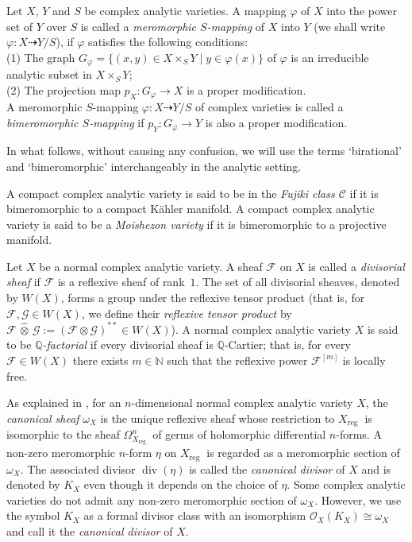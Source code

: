 \documentclass[12pt]{amsart}
\numberwithin{equation}{section}
\theoremstyle{definition}
\theoremstyle{plain}
\newtheorem*{thm A*}{Theorem A}
\newtheorem*{thm B*}{Theorem B}
\newtheorem*{thm C*}{Theorem C}
\newtheorem*{thm D*}{Theorem D}
\theoremstyle{definition}
\renewcommand{\1}{\mathds{1}}
\renewcommand{\>}{\rightarrow}
\begin{document}
Let $X$, $Y$ and $S$ be complex analytic varieties. A mapping $\varphi$ of $X$ into the power set of $Y$ over $S$ is called a \emph{meromorphic $S$-mapping} of $X$ into $Y$ (we shall write $\varphi: X \dashrightarrow Y/S$), if $\varphi$ satisfies the following conditions:\\
(1) The graph $G_{\varphi}=\{(x, y) \in X \times_S Y \mid y \in \varphi(x)\}$ of $\varphi$ is an irreducible analytic subset in ${X} \times_S {Y}$;\\
(2) The projection map ${p}_{{X}}: {G}_{\varphi} \to {X}$ is a proper modification. \\
A meromorphic $S$-mapping $\varphi: {X} \dashrightarrow {Y}/S$ of complex varieties is called a \emph{bimeromorphic $S$-mapping} if ${p}_{{Y}}: {G}_{\varphi} \to {Y}$ is also a proper modification. 

In what follows, without causing any confusion, we will use the terms `birational' and `bimeromorphic' interchangeably in the analytic setting.

A compact complex analytic variety is said to be in the \emph{Fujiki class $\mathcal{C}$} if it is bimeromorphic to a compact K\"ahler manifold. A compact complex analytic variety is said to be a \emph{Moishezon variety} if it is bimeromorphic to a projective manifold. 

Let $X$ be a normal complex analytic variety. A sheaf $\mathcal{F}$ on $X$ is called a \emph{divisorial sheaf} if $\mathcal{F}$ is a reflexive sheaf of rank~$1$. The set of all divisorial sheaves, denoted by $W(X)$, forms a group under the reflexive tensor product (that is, for $\mathcal{F}, \mathcal{G} \in W(X)$, we define their \emph{reflexive tensor product} by
$\mathcal{F} \,\hat{\otimes}\, \mathcal{G} := (\mathcal{F} \otimes \mathcal{G})^{**} \in W(X)$). A normal complex analytic variety $X$ is said to be \emph{$\mathbb{Q}$-factorial} if every divisorial sheaf is $\mathbb{Q}$-Cartier; that is, for every $\mathcal{F} \in W(X)$ there exists $m \in \mathbb{N}$ such that the reflexive power $\mathcal{F}^{[m]}$ is locally free.
 

As explained in \cite[II.2, p. 54]{Naka04}, for an $n$-dimensional normal complex analytic variety $X$, the \emph{canonical sheaf} $\omega_X$ is the unique reflexive sheaf whose restriction to $X_{\text {reg }}$ is isomorphic to the sheaf $\Omega_{X_{\text {reg }}}^n$ of germs of holomorphic differential $n$-forms. A non-zero meromorphic $n$-form $\eta$ on $X_{\text {reg }}$ is regarded as a meromorphic section of $\omega_X$. The associated divisor $\operatorname{div}(\eta)$ is called the \emph{canonical divisor} of $X$ and is denoted by $K_X$ even though it depends on the choice of $\eta$. Some complex analytic varieties do not admit any non-zero meromorphic section of $\omega_X$. However, we use the symbol $K_X$ as a formal divisor class with an isomorphism $\mathcal{O}_X(K_X)\cong \omega_X$ and call it the \emph{canonical divisor} of $X$. 
\end{document}

